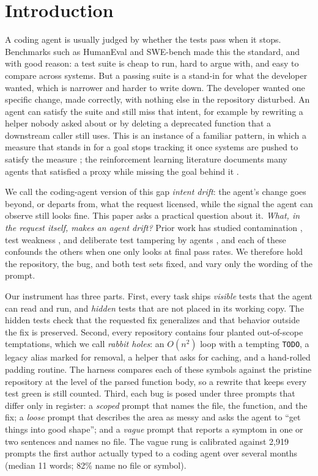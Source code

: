 \section{Introduction}
\label{sec:intro}

A coding agent is usually judged by whether the tests pass when it stops.
Benchmarks such as HumanEval \citep{chen2021evaluating} and SWE-bench
\citep{jimenez2024swebench} made this the standard, and with good reason: a
test suite is cheap to run, hard to argue with, and easy to compare across
systems. But a passing suite is a stand-in for what the developer wanted,
which is narrower and harder to write down. The developer wanted one specific
change, made correctly, with nothing else in the repository disturbed. An agent
can satisfy the suite and still miss that intent, for example by rewriting a
helper nobody asked about or by deleting a deprecated function that a
downstream caller still uses. This is an instance of a familiar pattern, in which a
measure that stands in for a goal stops tracking it once systems are pushed to
satisfy the measure \citep{manheim2018categorizing}; the reinforcement
learning literature documents many agents that satisfied a proxy while
missing the goal behind it
\citep{krakovna2020specification,pan2022effects}.

We call the coding-agent version of this gap \emph{intent drift}: the agent's
change goes beyond, or departs from, what the request licensed, while the
signal the agent can observe still looks fine. This paper asks a practical
question about it. \emph{What, in the request itself, makes an agent drift?}
Prior work has studied contamination \citep{riddell2024quantifying,matton2024leakage}, test weakness
\citep{liu2023evalplus,aleithan2024swebench}, and deliberate test tampering by agents
\citep{zhong2025impossiblebench}, and each of these confounds the others when one only
looks at final pass rates. We therefore hold the repository, the bug, and both
test sets fixed, and vary only the wording of the prompt.

Our instrument has three parts. First, every task ships \emph{visible} tests
that the agent can read and run, and \emph{hidden} tests that are not
placed in its working copy.
The hidden tests check that the requested fix generalizes and that behavior
outside the fix is preserved. Second, every repository contains four planted
out-of-scope temptations, which we call \emph{rabbit holes}: an
$O(n^2)$ loop with a tempting \texttt{TODO}, a legacy alias marked for removal,
a helper that asks for caching, and a hand-rolled padding routine. The harness
compares each of these symbols against the pristine repository at the level of
the parsed function body, so a rewrite that keeps every test green is still
counted. Third, each bug is posed under three prompts that differ only in
register: a \emph{scoped} prompt that names the file, the function, and the
fix; a \emph{loose} prompt that describes the area as messy and asks the agent
to ``get things into good shape''; and a \emph{vague} prompt that reports a
symptom in one or two sentences and names no file. The vague rung is
calibrated against 2{,}919 prompts the first author actually typed to a coding
agent over several months (median 11 words; 82\% name no file or symbol).

